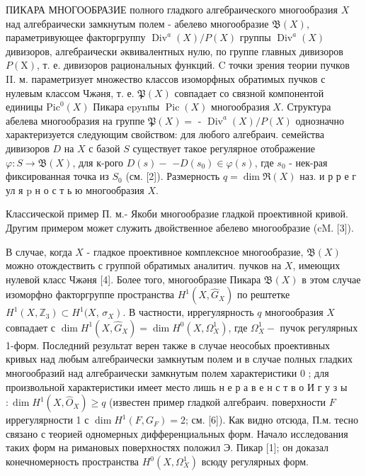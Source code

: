 \documentclass[10pt]{article}
\begin{document}
ПИКАРА МНОГООБРАЗИЕ полного гладкого алгебраического многообразия $X$ над алгебраически замкнутым полем - абелево многообразие $\mathfrak{B}(X)$, параметривующее факторгруппу $\operatorname{Div}^{a}(X) / P(X)$ группы $\operatorname{Div}^{a}(X)$ дивизоров, алгебраически әквивалентных нулю, по группе главных дивизоров $P(\mathrm{X})$, т. е. дивизоров рациональных функций. $\mathrm{C}$ точки зрения теории пучков II. м. параметризует множество классов изоморфных обратимых пучков с нулевым классом Чжәня, т. е. $\mathfrak{P}(X)$ совпадает со связной компонентой единицы $\mathrm{Pic}^{0}(X)$ Пикара epynпы $\operatorname{Pic}(X)$ многообразия $X$. Структура абелева многообразия на группе $\mathfrak{P}(X)=$ - $\operatorname{Div}^{a}(X) / P(X)$ однозначно характеризуется следующим свойством: для любого алгебраич. семейства дивизоров $D$ на $X$ с базой $S$ существует такое регулярное отображение $\varphi: S \rightarrow \mathfrak{B}(X)$, для к-рого $D(s)-$ $-D\left(s_{0}\right) \in \varphi(s)$, где $s_{0}$ - нек-рая фиксированная точка из $S_{0}$ (см. [2]). Размерность $q=\operatorname{dim} \Re(X)$ наз. и р р е г ул я $\mathrm{p}$ н о с т ь ю многообразия $X$.



Классической пример П. м.- Якоби многообразие гладкой проективной кривой. Другим примером может служить двойственное абелево многообразие (cM. [3]).



В случае, когда $X$ - гладкое проективное комплексное многообразие, $\mathfrak{B}(X)$ можно отождествить с группой обратимых аналитич. пучков на $X$, имеющих нулевой класс Чжәня [4]. Более того, многообразие Пикара $\mathfrak{B}(X)$ в этом случае изоморфно факторгруппе пространства $H^{1}\left(X, \widehat{G}_{X}\right)$ по рештетке $H^{1}\left(X, \mathbb{Z}_{3}\right) \subset H^{1}(X$, $\left.\sigma_{X}\right)$. В частности, иррегулярность $q$ многообразия $X$ совпадает с $\operatorname{dim} H^{1}\left(X, \hat{G}_{X}\right)=\operatorname{dim} H^{0}\left(X, \Omega_{X}^{1}\right)$, где $\Omega_{X}^{1}-$ пучок регулярных 1-форм. Последний результат верен также в случае неособых проективных кривых над любым алгебраически замкнутым полем и в случае полных гладких многообразий над алгебраически замкнутым полем характеристики 0 ; для произвольной характеристики имеет место лишь н е р а в е н с т в о И г у з ы $: \operatorname{dim} H^{1}\left(X, \widehat{O}_{X}\right) \geqslant q$ (известен пример гладкой алгебраич. поверхности $F$ иррегулярности 1 с $\operatorname{dim} H^{1}\left(F, G_{F}\right)=2$; см. [6]). Как видно отсюда, П.м. тесно связано с теорией одномерных дифференциальных форм. Начало исследования таких форм на римановых поверхностях положил Э. Пикар [1]; он доказал конечномерность пространства $H^{0}\left(X, \Omega_{X}^{1}\right)$ всюду регулярных форм.
\end{document}
